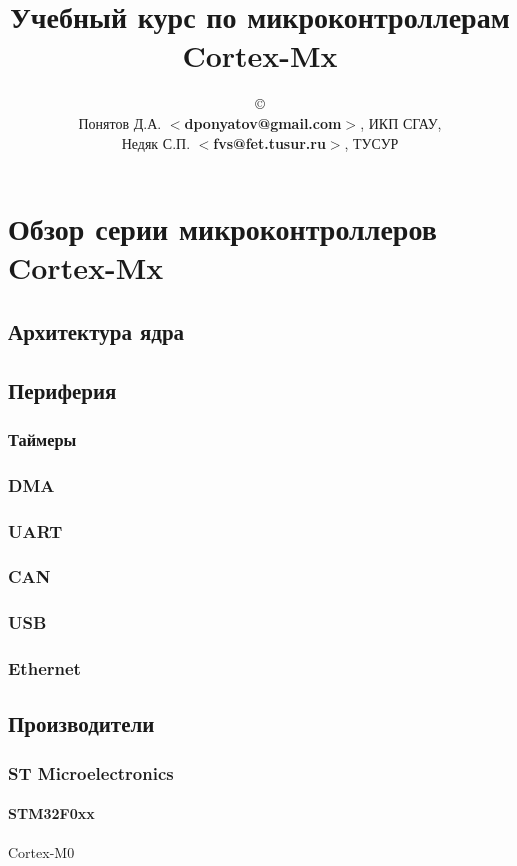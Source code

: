 \documentclass[oneside]{book}
\newcommand{\cm}[1]{Cortex-M#1}
\newcommand{\cx}{\cm{x}}
\newcommand{\email}[1]{$<$\textbf{#1}$>$}
\begin{document}
\title{Учебный курс по микроконтроллерам \cx}
\author{\copyright\\
Понятов Д.А. \email{dponyatov@gmail.com}, ИКП СГАУ, \\
Недяк С.П. \email{fvs@fet.tusur.ru}, ТУСУР
}
\maketitle
\tableofcontents

\part{Обзор серии микроконтроллеров \cx}

\chapter{Архитектура ядра}
\chapter{Периферия}
\section{Таймеры}
\section{DMA}
\section{UART}
\section{CAN}
\section{USB}
\section{Ethernet}
\chapter{Производители}
\section{ST Microelectronics}
\subsection{STM32F0xx} \cm{0}

\end{document}
